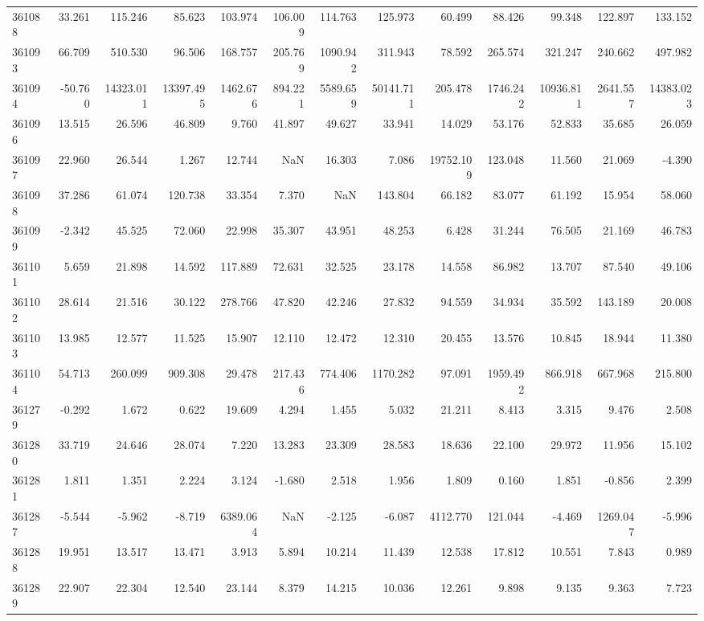 \begin{tabular}{lrrrrrrrrrrrr}
361088 & 33.261 & 115.246 & 85.623 & 103.974 & 106.009 & 114.763 & 125.973 & 60.499 & 88.426 & 99.348 & 122.897 & 133.152 \\
361093 & 66.709 & 510.530 & 96.506 & 168.757 & 205.769 & 1090.942 & 311.943 & 78.592 & 265.574 & 321.247 & 240.662 & 497.982 \\
361094 & -50.760 & 14323.011 & 13397.495 & 1462.676 & 894.221 & 5589.659 & 50141.711 & 205.478 & 1746.242 & 10936.811 & 2641.557 & 14383.023 \\
361096 & 13.515 & 26.596 & 46.809 & 9.760 & 41.897 & 49.627 & 33.941 & 14.029 & 53.176 & 52.833 & 35.685 & 26.059 \\
361097 & 22.960 & 26.544 & 1.267 & 12.744 & NaN & 16.303 & 7.086 & 19752.109 & 123.048 & 11.560 & 21.069 & -4.390 \\
361098 & 37.286 & 61.074 & 120.738 & 33.354 & 7.370 & NaN & 143.804 & 66.182 & 83.077 & 61.192 & 15.954 & 58.060 \\
361099 & -2.342 & 45.525 & 72.060 & 22.998 & 35.307 & 43.951 & 48.253 & 6.428 & 31.244 & 76.505 & 21.169 & 46.783 \\
361101 & 5.659 & 21.898 & 14.592 & 117.889 & 72.631 & 32.525 & 23.178 & 14.558 & 86.982 & 13.707 & 87.540 & 49.106 \\
361102 & 28.614 & 21.516 & 30.122 & 278.766 & 47.820 & 42.246 & 27.832 & 94.559 & 34.934 & 35.592 & 143.189 & 20.008 \\
361103 & 13.985 & 12.577 & 11.525 & 15.907 & 12.110 & 12.472 & 12.310 & 20.455 & 13.576 & 10.845 & 18.944 & 11.380 \\
361104 & 54.713 & 260.099 & 909.308 & 29.478 & 217.436 & 774.406 & 1170.282 & 97.091 & 1959.492 & 866.918 & 667.968 & 215.800 \\
361279 & -0.292 & 1.672 & 0.622 & 19.609 & 4.294 & 1.455 & 5.032 & 21.211 & 8.413 & 3.315 & 9.476 & 2.508 \\
361280 & 33.719 & 24.646 & 28.074 & 7.220 & 13.283 & 23.309 & 28.583 & 18.636 & 22.100 & 29.972 & 11.956 & 15.102 \\
361281 & 1.811 & 1.351 & 2.224 & 3.124 & -1.680 & 2.518 & 1.956 & 1.809 & 0.160 & 1.851 & -0.856 & 2.399 \\
361287 & -5.544 & -5.962 & -8.719 & 6389.064 & NaN & -2.125 & -6.087 & 4112.770 & 121.044 & -4.469 & 1269.047 & -5.996 \\
361288 & 19.951 & 13.517 & 13.471 & 3.913 & 5.894 & 10.214 & 11.439 & 12.538 & 17.812 & 10.551 & 7.843 & 0.989 \\
361289 & 22.907 & 22.304 & 12.540 & 23.144 & 8.379 & 14.215 & 10.036 & 12.261 & 9.898 & 9.135 & 9.363 & 7.723 \\

\end{tabular}

